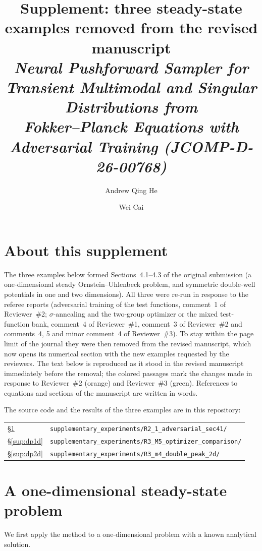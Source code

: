 \documentclass[11pt,a4paper]{article}
\title{\vspace{-1.2cm}Supplement: three steady-state examples removed from the revised manuscript\\[4pt]
\large\itshape Neural Pushforward Sampler for Transient Multimodal and Singular Distributions from\\
Fokker--Planck Equations with Adversarial Training (JCOMP-D-26-00768)}
\author{Andrew Qing He \and Wei Cai}
\date{}
\newcommand{\revtwo}[1]{\textcolor{revtwocolor}{#1}}
\newcommand{\revthree}[1]{\textcolor{revthreecolor}{#1}}
\begin{document}
\maketitle
\vspace{-1cm}

\section*{About this supplement}

The three examples below formed Sections~4.1--4.3 of the original submission (a one-dimensional
steady Ornstein--Uhlenbeck problem, and symmetric double-well potentials in one and two
dimensions). All three were re-run in response to the referee reports (adversarial training of
the test functions, comment~1 of Reviewer~\#2; $\sigma$-annealing and the two-group optimizer or
the mixed test-function bank, comment~4 of Reviewer~\#1, comment~3 of Reviewer~\#2 and comments~4,
5 and minor comment~4 of Reviewer~\#3). To stay within the page limit of the journal they were
then removed from the revised manuscript, which now opens its numerical section with the new
examples requested by the reviewers. The text below is reproduced as it stood in the revised
manuscript immediately before the removal; the colored passages mark the changes made in response
to Reviewer~\#2 (\revtwo{orange}) and Reviewer~\#3 (\revthree{green}). References to equations
and sections of the manuscript are written in words.

The source code and the results of the three examples are in this repository:
\begin{center}
\begin{tabular}{ll}
\S\ref{sup:ou} & \texttt{supplementary\_experiments/R2\_1\_adversarial\_sec41/}\\
\S\ref{sup:dp1d} & \texttt{supplementary\_experiments/R3\_M5\_optimizer\_comparison/}\\
\S\ref{sup:dp2d} & \texttt{supplementary\_experiments/R3\_m4\_double\_peak\_2d/}
\end{tabular}
\end{center}

\section{A one-dimensional steady-state problem}\label{sup:ou}

We first apply the method to a one-dimensional problem with a known analytical solution.
\end{document}
